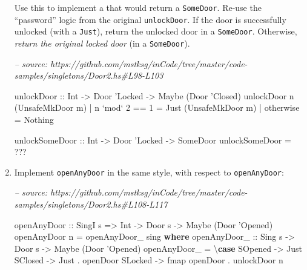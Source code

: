 \documentclass[]{article}
\newenvironment{Shaded}{}{}
\newcommand{\CommentTok}[1]{\textcolor[rgb]{0.38,0.63,0.69}{\textit{#1}}}
\newcommand{\DataTypeTok}[1]{\textcolor[rgb]{0.56,0.13,0.00}{#1}}
\newcommand{\DecValTok}[1]{\textcolor[rgb]{0.25,0.63,0.44}{#1}}
\newcommand{\FunctionTok}[1]{\textcolor[rgb]{0.02,0.16,0.49}{#1}}
\newcommand{\KeywordTok}[1]{\textcolor[rgb]{0.00,0.44,0.13}{\textbf{#1}}}
\newcommand{\NormalTok}[1]{#1}
\newcommand{\OtherTok}[1]{\textcolor[rgb]{0.00,0.44,0.13}{#1}}
\begin{document}
\begin{enumerate}
  Use this to implement a that would return a \texttt{SomeDoor}. Re-use the
  ``password'' logic from the original \texttt{unlockDoor}. If the door is
  successfully unlocked (with a \texttt{Just}), return the unlocked door in a
  \texttt{SomeDoor}. Otherwise, \emph{return the original locked door} (in a
  \texttt{SomeDoor}).

\begin{Shaded}
\begin{Highlighting}[]
\CommentTok{-- source: https://github.com/mstksg/inCode/tree/master/code-samples/singletons/Door2.hs#L98-L103}

\OtherTok{unlockDoor ::} \DataTypeTok{Int} \OtherTok{->} \DataTypeTok{Door}\NormalTok{ '}\DataTypeTok{Locked} \OtherTok{->} \DataTypeTok{Maybe}\NormalTok{ (}\DataTypeTok{Door}\NormalTok{ '}\DataTypeTok{Closed}\NormalTok{)}
\NormalTok{unlockDoor n (}\DataTypeTok{UnsafeMkDoor}\NormalTok{ m)}
    \FunctionTok{|}\NormalTok{ n }\OtherTok{`mod`} \DecValTok{2} \FunctionTok{==} \DecValTok{1} \FunctionTok{=} \DataTypeTok{Just}\NormalTok{ (}\DataTypeTok{UnsafeMkDoor}\NormalTok{ m)}
    \FunctionTok{|}\NormalTok{ otherwise      }\FunctionTok{=} \DataTypeTok{Nothing}

\OtherTok{unlockSomeDoor ::} \DataTypeTok{Int} \OtherTok{->} \DataTypeTok{Door}\NormalTok{ '}\DataTypeTok{Locked} \OtherTok{->} \DataTypeTok{SomeDoor}
\NormalTok{unlockSomeDoor }\FunctionTok{=} \FunctionTok{???}
\end{Highlighting}
\end{Shaded}
\item
  Implement \texttt{openAnyDoor\textquotesingle{}} in the same style, with
  respect to \texttt{openAnyDoor}:

\begin{Shaded}
\begin{Highlighting}[]
\CommentTok{-- source: https://github.com/mstksg/inCode/tree/master/code-samples/singletons/Door2.hs#L108-L117}

\OtherTok{openAnyDoor ::} \DataTypeTok{SingI}\NormalTok{ s }\OtherTok{=>} \DataTypeTok{Int} \OtherTok{->} \DataTypeTok{Door}\NormalTok{ s }\OtherTok{->} \DataTypeTok{Maybe}\NormalTok{ (}\DataTypeTok{Door}\NormalTok{ '}\DataTypeTok{Opened}\NormalTok{)}
\NormalTok{openAnyDoor n }\FunctionTok{=}\NormalTok{ openAnyDoor_ sing}
  \KeywordTok{where}
\OtherTok{    openAnyDoor_ ::} \DataTypeTok{Sing}\NormalTok{ s }\OtherTok{->} \DataTypeTok{Door}\NormalTok{ s }\OtherTok{->} \DataTypeTok{Maybe}\NormalTok{ (}\DataTypeTok{Door}\NormalTok{ '}\DataTypeTok{Opened}\NormalTok{)}
\NormalTok{    openAnyDoor_ }\FunctionTok{=}\NormalTok{ \textbackslash{}}\KeywordTok{case}
      \DataTypeTok{SOpened} \OtherTok{->} \DataTypeTok{Just}
      \DataTypeTok{SClosed} \OtherTok{->} \DataTypeTok{Just} \FunctionTok{.}\NormalTok{ openDoor}
      \DataTypeTok{SLocked} \OtherTok{->}\NormalTok{ fmap openDoor }\FunctionTok{.}\NormalTok{ unlockDoor n}


\end{Highlighting}
\end{Shaded}
\end{enumerate}
\end{document}
